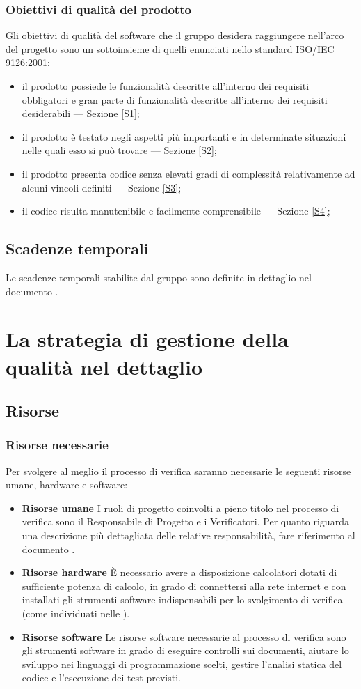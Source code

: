 		\subsubsection{Obiettivi di qualità del prodotto}
		Gli obiettivi di qualità del software che il gruppo \hx{} desidera raggiungere nell'arco del progetto sono un sottoinsieme di quelli enunciati nello standard ISO/IEC 9126:2001:
		\begin{itemize}
			\item il prodotto possiede le funzionalità descritte all'interno dei requisiti obbligatori e gran parte di funzionalità descritte all'interno dei requisiti desiderabili --- Sezione \ref{S1};
			\item il prodotto è testato negli aspetti più importanti e in determinate situazioni nelle quali esso si può trovare --- Sezione \ref{S2};
			\item il prodotto presenta codice senza elevati gradi di complessità relativamente ad alcuni vincoli definiti --- Sezione \ref{S3};
			\item il codice risulta manutenibile e facilmente comprensibile --- Sezione \ref{S4};
		\end{itemize}
	\subsection{Scadenze temporali}
	Le scadenze temporali stabilite dal gruppo sono definite in dettaglio nel documento \PdP.
\newpage
\section{La strategia di gestione della qualità nel dettaglio}
	\subsection{Risorse}
		\subsubsection{Risorse necessarie}
		Per svolgere al meglio il processo di verifica saranno necessarie le seguenti risorse umane, hardware e software:
		\begin{itemize}
			\item \textbf{Risorse umane}
			I ruoli di progetto coinvolti a pieno titolo nel processo di verifica sono il Responsabile di Progetto e i Verificatori. Per quanto riguarda una descrizione più dettagliata delle relative responsabilità, fare riferimento al documento \NdP.
			\item \textbf{Risorse hardware}
			  È necessario avere a disposizione calcolatori dotati di sufficiente potenza di calcolo, in grado di connettersi alla rete internet e con installati gli strumenti software indispensabili per lo svolgimento di verifica (come individuati nelle \NdP).
			\item \textbf{Risorse software}
			Le risorse software necessarie al processo di verifica sono gli strumenti software in grado di eseguire controlli sui documenti, aiutare lo sviluppo nei linguaggi di programmazione scelti, gestire l'analisi statica del codice e l'esecuzione dei test previsti.
		\end{itemize}
